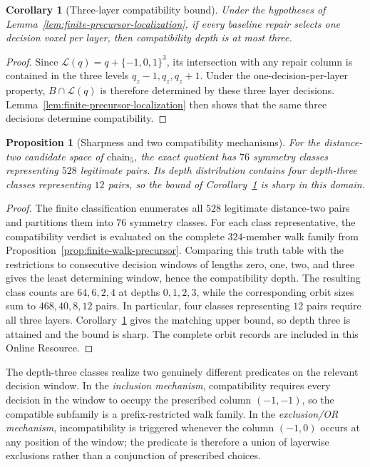 \documentclass[11pt]{article}
\newtheorem{proposition}[theorem]{Proposition}
\newtheorem{corollary}[theorem]{Corollary}
\begin{document}
\begin{corollary}[Three-layer compatibility bound]
\label{cor:finite-precursor-depth}
Under the hypotheses of
Lemma~\ref{lem:finite-precursor-localization}, if every baseline repair selects
one decision voxel per layer, then compatibility depth is at most three.
\end{corollary}

\begin{proof}
Since $\mathcal L(q)=q+\{-1,0,1\}^3$, its intersection with any repair column
is contained in the three levels $q_z-1,q_z,q_z+1$.  Under the
one-decision-per-layer property, $B\cap\mathcal L(q)$ is therefore determined
by these three layer decisions.  Lemma~\ref{lem:finite-precursor-localization}
then shows that the same three decisions determine compatibility.
\end{proof}

\begin{proposition}[Sharpness and two compatibility mechanisms]
\label{prop:finite-precursor-sharpness}
For the distance-two candidate space of $\mathrm{chain}_5$, the exact quotient
has $76$ symmetry classes representing $528$ legitimate pairs.  Its depth
distribution contains four depth-three classes representing $12$ pairs, so
the bound of Corollary~\ref{cor:finite-precursor-depth} is sharp in this
domain.
\end{proposition}

\begin{proof}
The finite classification enumerates all $528$ legitimate distance-two pairs
and partitions them into $76$ symmetry classes.  For each class
representative, the compatibility verdict is evaluated on the complete
$324$-member walk family from Proposition~\ref{prop:finite-walk-precursor}.
Comparing this truth table with the restrictions to consecutive decision
windows of lengths zero, one, two, and three gives the least determining
window, hence the compatibility depth.  The resulting class counts are
$64,6,2,4$ at depths $0,1,2,3$, while the corresponding orbit sizes sum to
$468,40,8,12$ pairs.  In particular, four classes representing $12$ pairs
require all three layers.  Corollary~\ref{cor:finite-precursor-depth} gives the
matching upper bound, so depth three is attained and the bound is sharp.
The complete orbit records are included in this Online Resource.
\end{proof}

The depth-three classes realize two genuinely different predicates on the
relevant decision window.  In the \emph{inclusion mechanism}, compatibility
requires every decision in the window to occupy the prescribed column
$(-1,-1)$, so the compatible subfamily is a prefix-restricted walk family.
In the \emph{exclusion/OR mechanism}, incompatibility is triggered whenever
the column $(-1,0)$ occurs at any position of the window; the predicate is
therefore a union of layerwise exclusions rather than a conjunction of
prescribed choices.
\end{document}
